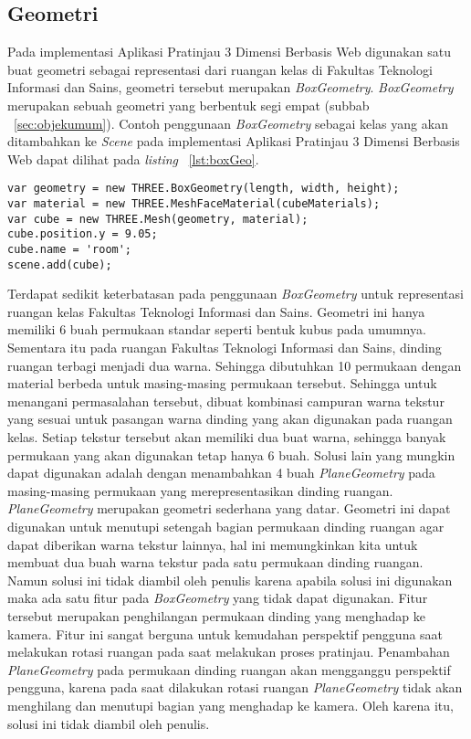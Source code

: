 \subsection{Geometri}
\label{sec:analisisgeometri}
Pada implementasi Aplikasi Pratinjau 3 Dimensi Berbasis Web digunakan satu buat geometri sebagai representasi dari ruangan kelas di Fakultas Teknologi Informasi dan Sains, geometri tersebut merupakan {\it BoxGeometry}. {\it BoxGeometry} merupakan sebuah geometri yang berbentuk segi empat (subbab ~\ref{sec:objekumum}). Contoh penggunaan {\it BoxGeometry} sebagai kelas yang akan ditambahkan ke {\it Scene} pada implementasi Aplikasi Pratinjau 3 Dimensi Berbasis Web dapat dilihat pada {\it listing} ~\ref{lst:boxGeo}.
\begin{lstlisting}[caption={Contoh penggunaan {\it BoxGeometry}}, label={lst:boxGeo},captionpos=b]
var geometry = new THREE.BoxGeometry(length, width, height);
var material = new THREE.MeshFaceMaterial(cubeMaterials);
var cube = new THREE.Mesh(geometry, material);
cube.position.y = 9.05;
cube.name = 'room';
scene.add(cube);
\end{lstlisting}
Terdapat sedikit keterbatasan pada penggunaan {\it BoxGeometry} untuk representasi ruangan kelas Fakultas Teknologi Informasi dan Sains. Geometri ini hanya memiliki 6 buah permukaan standar seperti bentuk kubus pada umumnya. Sementara itu pada ruangan Fakultas Teknologi Informasi dan Sains, dinding ruangan terbagi menjadi dua warna. Sehingga dibutuhkan 10 permukaan dengan material berbeda untuk masing-masing permukaan tersebut. Sehingga untuk menangani permasalahan tersebut, dibuat kombinasi campuran warna tekstur yang sesuai untuk pasangan warna dinding yang akan digunakan pada ruangan kelas. Setiap tekstur tersebut akan memiliki dua buat warna, sehingga banyak permukaan yang akan digunakan tetap hanya 6 buah.
Solusi lain yang mungkin dapat digunakan adalah dengan menambahkan 4 buah {\it PlaneGeometry} pada masing-masing permukaan yang merepresentasikan dinding ruangan. {\it PlaneGeometry} merupakan geometri sederhana yang datar. Geometri ini dapat digunakan untuk menutupi setengah bagian permukaan dinding ruangan agar dapat diberikan warna tekstur lainnya, hal ini memungkinkan kita untuk membuat dua buah warna tekstur pada satu permukaan dinding ruangan. Namun solusi ini tidak diambil oleh penulis karena apabila solusi ini digunakan maka ada satu fitur pada {\it BoxGeometry} yang tidak dapat digunakan. Fitur tersebut merupakan penghilangan permukaan dinding yang menghadap ke kamera. Fitur ini sangat berguna untuk kemudahan perspektif pengguna saat melakukan rotasi ruangan pada saat melakukan proses pratinjau. Penambahan {\it PlaneGeometry} pada permukaan dinding ruangan akan mengganggu perspektif pengguna, karena pada saat dilakukan rotasi ruangan {\it PlaneGeometry} tidak akan menghilang dan menutupi bagian yang menghadap ke kamera. Oleh karena itu, solusi ini tidak diambil oleh penulis.

